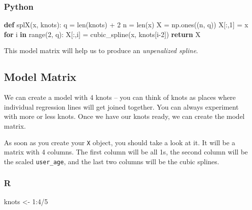 \documentclass[
  letterpaper,
]{krantz}
\newenvironment{Shaded}{}{}
\newcommand{\BuiltInTok}[1]{\textcolor[rgb]{0.00,0.50,0.00}{#1}}
\newcommand{\ControlFlowTok}[1]{\textcolor[rgb]{0.00,0.44,0.13}{\textbf{#1}}}
\newcommand{\DecValTok}[1]{\textcolor[rgb]{0.25,0.63,0.44}{#1}}
\newcommand{\KeywordTok}[1]{\textcolor[rgb]{0.00,0.44,0.13}{\textbf{#1}}}
\newcommand{\NormalTok}[1]{#1}
\newcommand{\OperatorTok}[1]{\textcolor[rgb]{0.40,0.40,0.40}{#1}}
\newcommand{\OtherTok}[1]{\textcolor[rgb]{0.00,0.44,0.13}{#1}}
\newcommand{\SpecialCharTok}[1]{\textcolor[rgb]{0.25,0.44,0.63}{#1}}
\begin{document}
\subsubsection{Python}

\begin{Shaded}
\begin{Highlighting}[]
\KeywordTok{def}\NormalTok{ splX(x, knots):}
\NormalTok{    q }\OperatorTok{=} \BuiltInTok{len}\NormalTok{(knots) }\OperatorTok{+} \DecValTok{2}
\NormalTok{    n }\OperatorTok{=} \BuiltInTok{len}\NormalTok{(x)}
\NormalTok{    X }\OperatorTok{=}\NormalTok{ np.ones((n, q))}
\NormalTok{    X[:,}\DecValTok{1}\NormalTok{] }\OperatorTok{=}\NormalTok{ x}
    \ControlFlowTok{for}\NormalTok{ i }\KeywordTok{in} \BuiltInTok{range}\NormalTok{(}\DecValTok{2}\NormalTok{, q):}
\NormalTok{        X[:,i] }\OperatorTok{=}\NormalTok{ cubic\_spline(x, knots[i}\OperatorTok{{-}}\DecValTok{2}\NormalTok{])}
    \ControlFlowTok{return}\NormalTok{ X}
\end{Highlighting}
\end{Shaded}

This model matrix will help us to produce an \emph{unpenalized spline}.

\subsection{Model Matrix}\label{model-matrix}

We can create a model with 4 knots -- you can think of knots as places
where individual regression lines will get joined together. You can
always experiment with more or less knots. Once we have our knots ready,
we can create the model matrix.

As soon as you create your \texttt{X} object, you should take a look at
it. It will be a matrix with 4 columns. The first column will be all 1s,
the second column will be the scaled \texttt{user\_age}, and the last
two columns will be the cubic splines.

\subsubsection{R}

\begin{Shaded}
\begin{Highlighting}[]
\NormalTok{knots }\OtherTok{\textless{}{-}} \DecValTok{1}\SpecialCharTok{:}\DecValTok{4}\SpecialCharTok{/}\DecValTok{5}
\end{Highlighting}
\end{Shaded}
\end{document}
